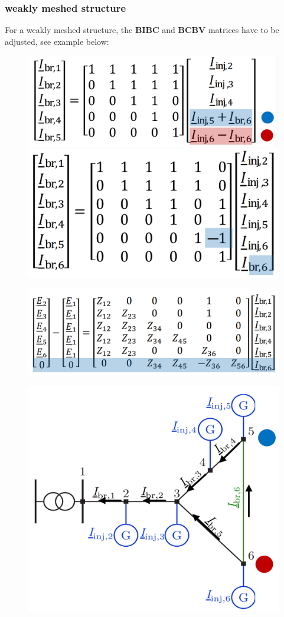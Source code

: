 \documentclass[a4paper,10pt,landscape]{scrartcl}
\begin{document}
\begin{multicols*}{3}
\subsubsection{weakly meshed structure}
For a weakly meshed structure, the \textbf{BIBC} and \textbf{BCBV} matrices have to be adjusted, see example below:
\begin{figure}[H]
    \centering
    \includegraphics[width=.49\linewidth]{src/BIBC_01.png}
    \includegraphics[width=0.49\linewidth]{src/BIBC_02.png}
\end{figure}
\begin{figure}[H]
    \centering
    \includegraphics[width=1\linewidth]{src/BCBV.png}
\end{figure}

\begin{figure}[H]
    \centering
    \includegraphics[width=.7\linewidth]{src/weakly_meshed.png}
\end{figure}
\vspace{-1cm}



\end{multicols*}
\end{document}
